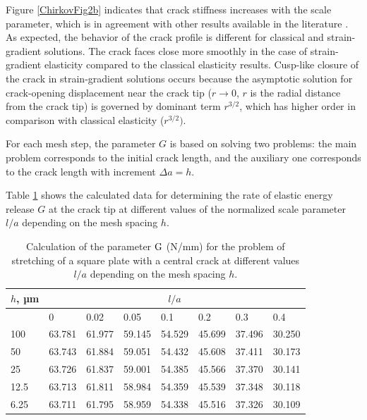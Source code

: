 Figure \ref{ChirkovFig2b} indicates that crack stiffness increases with the scale parameter, which is in agreement with other results available in the literature \cite{Chirkov14, Chirkov31, Chirkov37, Chirkov48}. As expected, the behavior of the crack profile is different for classical and strain-gradient solutions. The crack faces close more smoothly in the case of strain-gradient elasticity compared to the classical elasticity results. Cusp-like closure of the crack in strain-gradient solutions occurs because the asymptotic solution for crack-opening displacement near the crack tip ($r\to 0$, $r$ is the radial distance from the crack tip) is governed by dominant term $r^{{3}/{2}}$, which has higher order in comparison with classical elasticity ($r^{{3}/{2}})$. 

For each mesh step, the parameter $G$ is based on solving two problems: the main problem corresponds to the initial crack length, and the auxiliary one corresponds to the crack length with increment $\Delta a=h$.

Table \ref{ChirkovTab} shows the calculated data for determining the rate of elastic energy release $G$ at the crack tip at different values of the normalized scale parameter $l/a$ depending on the mesh spacing $h$.

\begin{table}
	\centering
	\caption{Calculation of the parameter ${\rm G}$ (N/mm) for the problem of stretching of a square plate with a central crack at different values $l/a$ depending on the mesh spacing $h$.}
	\begin{tabular*}{.9\textwidth}{@{\extracolsep{\fill}}llllllll} \hline 
		$h$, µm & \multicolumn{7}{c}{${l}/{a}$} \\ \hline 
		& 0 & 0.02 & 0.05 & 0.1 & 0.2 & 0.3 & 0.4 \\ \hline 
		100 & 63.781 & 61.977 & 59.145 & 54.529 & 45.699 & 37.496 & 30.250 \\ \hline 
		50 & 63.743 & 61.884 & 59.051 & 54.432 & 45.608 & 37.411 & 30.173 \\ \hline 
		25 & 63.726 & 61.837 & 59.001 & 54.385 & 45.566 & 37.370 & 30.141 \\ \hline 
		12.5 & 63.713 & 61.811 & 58.984 & 54.359 & 45.539 & 37.348 & 30.118 \\ \hline 
		6.25 & 63.711 & 61.795 & 58.959 & 54.338 & 45.516 & 37.326 & 30.109 \\ \hline 
	\end{tabular*}
	\label{ChirkovTab}
\end{table}

